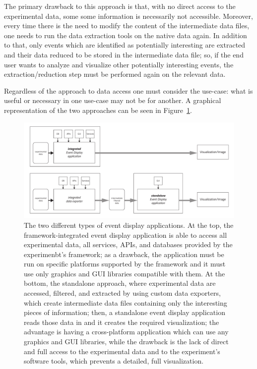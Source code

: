 \documentclass[12pt,a4paper]{article}
\begin{document}
The primary drawback to this approach is that, with no direct access to the experimental data, some
some information is necessarily not accessible. Moreover, every time there is the need to modify the content of the
intermediate data files, one needs to run the data extraction tools on the native data again.
In addition to that, only events which are identified as potentially interesting are extracted and their
data reduced to be stored in the intermediate data file; so, if the end user wants to analyze and visualize other
potentially interesting events, the extraction/reduction step must be performed again on the relevant data.

Regardless of the approach to data access one must consider the use-case: what is useful or necessary
in one use-case may not be for another. A graphical representation of the two approaches can be
seen in Figure~\ref{fig:eventdisplaysapplicationstypes}.

\begin{figure}
	\centering
	\includegraphics[width=\linewidth]{img/eventDisplays_applications_types}
	\caption[Different types of event display applications]{The two different types of event display applications. At the top,
	the framework-integrated event display application is able to access all experimental data, all services, APIs, and databases
	provided by the experimenbt's framework; as a drawback, the application must be run on specific platforms supported by the
	framework and it must use only graphics and GUI libraries compatible with them. At the bottom, the standalone approach, where
	experimental data are accessed, filtered, and extracted by using custom data exporters, which create intermediate data files
	containing only the interesting pieces of information; then, a standalone event display application reads those data in and it
	creates the required visualization; the advantage is having a cross-platform application which can use any graphics and GUI libraries,
	while the drawback is the lack of direct and full access to the experimental data and to the experiment's software tools,
	which prevents a detailed, full visualization.}
	\label{fig:eventdisplaysapplicationstypes}
\end{figure}
\end{document}
